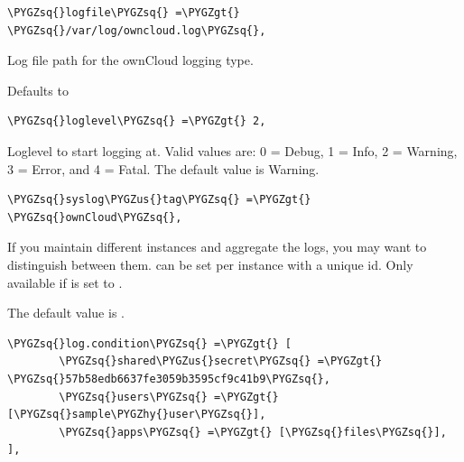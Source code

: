 \documentclass[letterpaper,10pt,english]{sphinxmanual}
\def\PYGZus{\char`\_}
\def\PYGZgt{\char`\>}
\def\PYGZhy{\char`\-}
\def\PYGZsq{\char`\'}
\begin{document}
\begin{Verbatim}[commandchars=\\\{\}]
\PYGZsq{}logfile\PYGZsq{} =\PYGZgt{} \PYGZsq{}/var/log/owncloud.log\PYGZsq{},
\end{Verbatim}

Log file path for the ownCloud logging type.

Defaults to 

\begin{Verbatim}[commandchars=\\\{\}]
\PYGZsq{}loglevel\PYGZsq{} =\PYGZgt{} 2,
\end{Verbatim}

Loglevel to start logging at. Valid values are: 0 = Debug, 1 = Info, 2 =
Warning, 3 = Error, and 4 = Fatal. The default value is Warning.

\begin{Verbatim}[commandchars=\\\{\}]
\PYGZsq{}syslog\PYGZus{}tag\PYGZsq{} =\PYGZgt{} \PYGZsq{}ownCloud\PYGZsq{},
\end{Verbatim}

If you maintain different instances and aggregate the logs, you may want
to distinguish between them.  can be set per instance
with a unique id. Only available if  is set to .

The default value is .

\begin{Verbatim}[commandchars=\\\{\}]
\PYGZsq{}log.condition\PYGZsq{} =\PYGZgt{} [
        \PYGZsq{}shared\PYGZus{}secret\PYGZsq{} =\PYGZgt{} \PYGZsq{}57b58edb6637fe3059b3595cf9c41b9\PYGZsq{},
        \PYGZsq{}users\PYGZsq{} =\PYGZgt{} [\PYGZsq{}sample\PYGZhy{}user\PYGZsq{}],
        \PYGZsq{}apps\PYGZsq{} =\PYGZgt{} [\PYGZsq{}files\PYGZsq{}],
],
\end{Verbatim}
\end{document}
